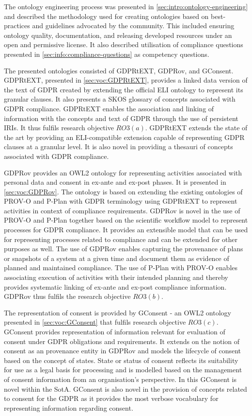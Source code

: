 The ontology engineering process was presented in \autoref{sec:intro:ontology-engineering} and described the methodology used for creating ontologies based on best-practices and guidelines advocated by the community. This included ensuring ontology quality, documentation, and releasing developed resources under an open and permissive license.
It also described utilisation of compliance questions presented in \autoref{sec:info:compliance-questions} as competency questions.

The presented ontologies consisted of GDPRtEXT, GDPRov, and GConsent.
GDPRtEXT, presented in \autoref{sec:voc:GDPRtEXT}, provides a linked data version of the text of GDPR created by extending the official ELI \cite{ELI_2012} ontology to represent its granular clauses. It also presents a SKOS glossary of concepts associated with GDPR compliance. GDPRtEXT enables the association and linking of information with the concepts and text of GDPR through the use of persistent IRIs. It thus fulfils research objective $RO3(a)$. GDPRtEXT extends the state of the art by providing an ELI-compatible extension capable of representing GDPR clauses at a granular level. It is also novel in providing a thesauri of concepts associated with GDPR compliance.

GDPRov provides an OWL2 ontology for representing activities associated with personal data and consent in ex-ante and ex-post phases. It is presented in \autoref{sec:voc:GDPRov}.
The ontology is based on extending the existing ontologies of PROV-O \cite{lebo_prov-o_2013} and P-Plan \cite{garijo_p-plan_2014} with GDPR terminology using GDPRtEXT to represent activities in context of compliance requirements. GDPRov is novel in the use of PROV-O and P-Plan together based on the scientific workflow model to represent processes for GDPR compliance.
It provides an extensible model that can be used for representing processes related to compliance and can be extended for other purposes as well.
The use of GDPRov enables capturing the provenance of plans or snapshots of a system at a given time and document them as evidence of planned and maintained compliance.
The use of P-Plan with PROV-O enables associating execution of activities with their intended planning and thereby provides systematic linking of ex-ante and ex-post compliance information.
GDPRov thus fulfils the research objective $RO3(b)$.

The representation of consent is provided by GConsent - an OWL2 ontology presented in \autoref{sec:voc:GConsent} that fulfils research objective $RO3(c)$.
GConsent provides representation of information relevant for evaluation of consent under GDPR obligations and requirements.
It extends on the notion of consent as an provenance entity in GDPRov and models the lifecycle of consent based on the concept of states.
State or status of consent reflects its suitability for use as a legal basis for processing and is modelled based on the management of consent information from an organisation's perspective. In this GConsent is novel within the SotA.
GConsent is also novel in the provision of concepts related to consent for the GDPR as it provides the most verbose vocabulary for representing information regarding consent.

